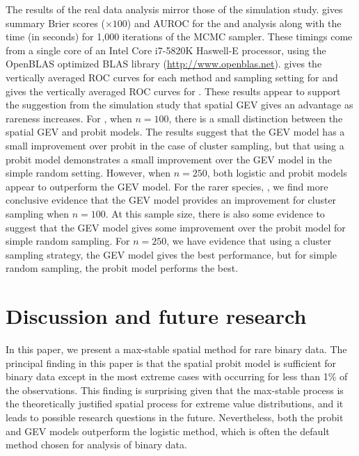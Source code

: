 The results of the real data analysis mirror those of the simulation study.
 gives summary Brier scores ($\times 100$) and AUROC for the \tamarix{} and \hedysarum{} analysis along with the time (in seconds) for 1,000 iterations of the MCMC sampler.
These timings come from a single core of an Intel Core i7-5820K Haswell-E processor, using the OpenBLAS optimized BLAS library (\url{http://www.openblas.net}).
 gives the vertically averaged ROC curves for each method and sampling setting for \tamarix{} and  gives the vertically averaged ROC curves for \hedysarum{}.
These results appear to support the suggestion from the simulation study that spatial GEV gives an advantage as rareness increases.
For \tamarix, when $n = 100$, there is a small distinction between the spatial GEV and probit models.
The results suggest that the GEV model has a small improvement over probit in the case of cluster sampling, but that using a probit model demonstrates a small improvement over the GEV model in the simple random setting.
However, when $n = 250$, both logistic and probit models appear to outperform the GEV model.
For the rarer species, \hedysarum, we find more conclusive evidence that the GEV model provides an improvement for cluster sampling when $n = 100$.
At this sample size, there is also some evidence to suggest that the GEV model gives some improvement over the probit model for simple random sampling.
For $n = 250$, we have evidence that using a cluster sampling strategy, the GEV model gives the best performance, but for simple random sampling, the probit model performs the best.

\section{Discussion and future research}\label{rbs:conclusions}

In this paper, we present a max-stable spatial method for rare binary data.
The principal finding in this paper is that the spatial probit model is sufficient for binary data except in the most extreme cases with occurring for less than 1\% of the observations.
This finding is surprising given that the max-stable process is the theoretically justified spatial process for extreme value distributions, and it leads to possible research questions in the future.
Nevertheless, both the probit and GEV models  outperform the logistic method, which is often the default method chosen for analysis of binary data.

